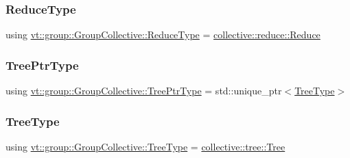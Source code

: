 \mbox{\label{structvt_1_1group_1_1_group_collective_acc03682a21dc3e4293720c0f6677c88d}} 
\subsubsection{\texorpdfstring{Reduce\+Type}{ReduceType}}
{\footnotesize\ttfamily using \hyperlink{structvt_1_1group_1_1_group_collective_acc03682a21dc3e4293720c0f6677c88d}{vt\+::group\+::\+Group\+Collective\+::\+Reduce\+Type} =  \hyperlink{structvt_1_1collective_1_1reduce_1_1_reduce}{collective\+::reduce\+::\+Reduce}}

\mbox{\label{structvt_1_1group_1_1_group_collective_a2e02dc375f193620af9832f187029188}} 
\subsubsection{\texorpdfstring{Tree\+Ptr\+Type}{TreePtrType}}
{\footnotesize\ttfamily using \hyperlink{structvt_1_1group_1_1_group_collective_a2e02dc375f193620af9832f187029188}{vt\+::group\+::\+Group\+Collective\+::\+Tree\+Ptr\+Type} =  std\+::unique\+\_\+ptr$<$\hyperlink{structvt_1_1group_1_1_group_collective_abae59cc0eb4512145a039fb47fff6a25}{Tree\+Type}$>$}

\mbox{\label{structvt_1_1group_1_1_group_collective_abae59cc0eb4512145a039fb47fff6a25}} 
\subsubsection{\texorpdfstring{Tree\+Type}{TreeType}}
{\footnotesize\ttfamily using \hyperlink{structvt_1_1group_1_1_group_collective_abae59cc0eb4512145a039fb47fff6a25}{vt\+::group\+::\+Group\+Collective\+::\+Tree\+Type} =  \hyperlink{structvt_1_1collective_1_1tree_1_1_tree}{collective\+::tree\+::\+Tree}}



